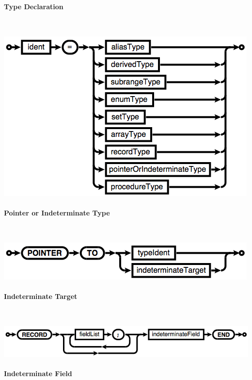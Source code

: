 \documentclass[10pt,a4paper]{article}
\newcommand\sourcecaption[1]{\noindent\normalfont\small\textsf{#1}}
\begin{document}
\paragraph{\sourcecaption{Type Declaration}}~

\noindent\includegraphics[scale=0.75]{typeDeclaration.png}

\paragraph{\sourcecaption{Pointer or Indeterminate Type}}~

\noindent\includegraphics[scale=0.75]{pointerOrIndeterminateType.png}

\paragraph{\sourcecaption{Indeterminate Target}}~

\noindent\includegraphics[scale=0.75]{indeterminateTarget.png}

\paragraph{\sourcecaption{Indeterminate Field}}~
\end{document}
